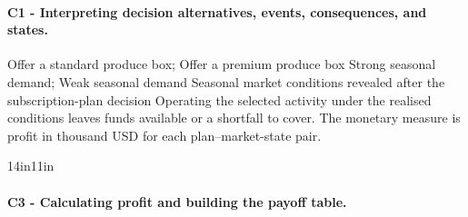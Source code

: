 	\paragraph*{C1 - Interpreting decision alternatives, events, consequences, and states.}
	\DecisionElementsTable
{Offer a standard produce box; Offer a premium produce box}
{Strong seasonal demand; Weak seasonal demand}
{Seasonal market conditions revealed after the subscription-plan decision}
{Operating the selected activity under the realised conditions leaves funds available or a shortfall to cover. The monetary measure is profit in thousand USD for each plan--market-state pair.}



	\begin{CalculationLandscape}{14in}{11in}
\paragraph*{C3 - Calculating profit and building the payoff table.}
\leavevmode\par


\end{CalculationLandscape}
